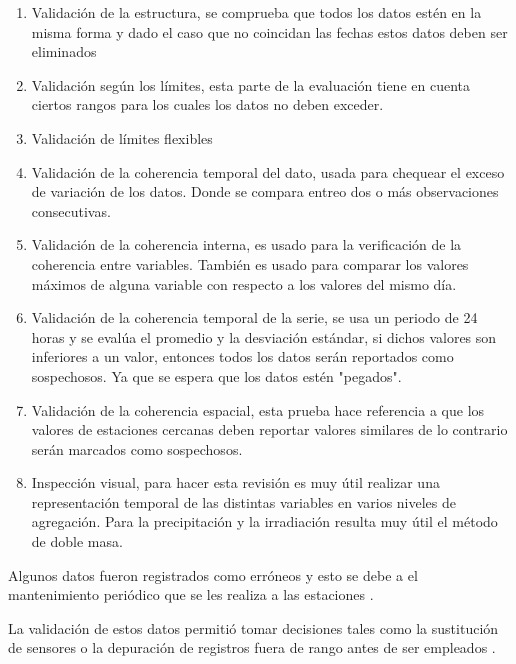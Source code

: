 \documentclass[11pt]{article}
\begin{document}
\begin{enumerate}
\item Validación de la estructura, se comprueba que todos los datos estén en la misma forma y dado el caso que no coincidan las fechas estos datos deben ser eliminados

\item Validación según los límites, esta parte de la evaluación tiene en cuenta ciertos rangos para los cuales los datos no deben exceder.

\item Validación de límites flexibles

\item Validación de la coherencia temporal del dato, usada para chequear el exceso de variación de los datos. Donde se compara entreo dos o más observaciones consecutivas.

\item Validación de la coherencia interna, es usado para la verificación de la coherencia entre variables. También es usado para comparar los valores máximos de alguna variable con respecto a los valores del mismo día.

\item Validación de la coherencia temporal de la serie, se usa un periodo de 24 horas y se evalúa el promedio y la desviación estándar, si dichos valores son inferiores a un valor, entonces todos los datos serán reportados como sospechosos. Ya que se espera que los datos estén "pegados".

\item Validación de la coherencia espacial, esta prueba hace referencia a que los valores de estaciones cercanas deben reportar valores similares de lo contrario serán marcados como sospechosos.

\item Inspección visual, para hacer esta revisión es muy útil realizar una representación temporal de las distintas variables en varios niveles de agregación. Para la precipitación y la irradiación resulta muy útil el método de doble masa.

\end{enumerate}

Algunos datos fueron registrados como erróneos y esto se debe a el mantenimiento periódico que se les realiza a las estaciones \citep{Estevez2008}.

La validación de estos datos permitió tomar decisiones tales como la sustitución de sensores o la depuración de registros fuera de rango antes de ser empleados \citep{Estevez2008}.
\end{document}
